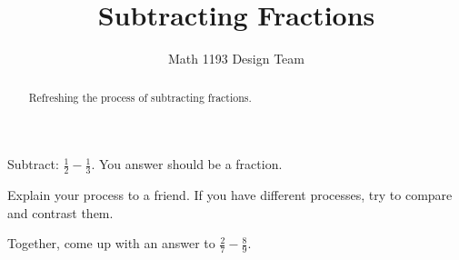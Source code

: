 \documentclass[noauthor]{ximera}
\title{Subtracting Fractions}
\author{Math 1193 Design Team}
\begin{document}
\begin{abstract}
    Refreshing the process of subtracting fractions.
\end{abstract}
\maketitle

Subtract: \(\frac{1}{2} - \frac{1}{3}\). You answer should be a fraction.

Explain your process to a friend. If you have different processes,
try to compare and contrast them. 

Together, come up with an answer to \(\frac{2}{7} - \frac{8}{9}\).
\end{document}
